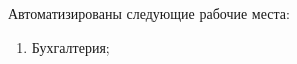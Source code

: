 \begin{enumerate}
\end{enumerate}
%

Автоматизированы следующие рабочие места:
\begin{enumerate}
\item Бухгалтерия;
\end{enumerate}









